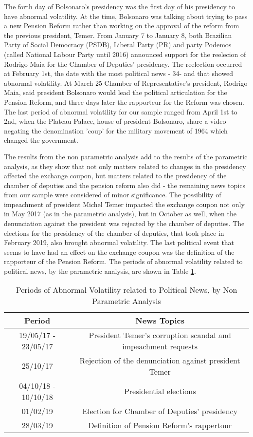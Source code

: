 \documentclass[a4paper]{article}
\begin{document}
The forth day of Bolsonaro's presidency was the first day of his presidency to have abnormal volatility. At the time, Bolsonaro was talking about trying to pass a new Pension Reform rather than working on the approval of the reform from the previous president, Temer. From January 7 to January 8, both Brazilian Party of Social Democracy (PSDB), Liberal Party (PR) and party Podemos (called National Labour Party until 2016) announced support for the reelecion of Rodrigo Maia for the Chamber of Deputies' presidency. The reelection occurred at February 1st, the date with the most political news - 34- and that showed abnormal volatility. At March 25 Chamber of Representative's president, Rodrigo Maia, said president Bolsonaro would lead the political articulation for the Pension Reform, and three days later the rapporteur for the Reform was chosen. The last period of abnormal volatility for our sample ranged from April 1st to 2nd, when the Plateau Palace, house of president Bolsonaro, share a video negating the denomination 'coup' for the military movement of 1964 which changed the government.

The results from the non parametric analysis add to the results of the parametric analysis, as they show that not only matters related to changes in the presidency affected the exchange coupon, but matters related to the presidency of the chamber of deputies and the pension reform also did - the remaining news topics from our sample were considered of minor significance. The possibility of impeachment of president Michel Temer impacted the exchange coupon not only in May 2017 (as in the parametric analysis), but in October as well, when the denunciation against the president was rejected by the chamber of deputies. The elections for the presidency of the chamber of deputies, that took place in February 2019, also brought abnormal volatility. The last political event that seems to have had an effect on the exchange coupon was the definition of the rapporteur of the Pension Reform. The periods of abnormal volatility related to political news, by the parametric analysis, are shown in Table \ref{tab:resnon}.

\begin{table}[H]
\caption{Periods of Abnormal Volatility related to Political News, by Non Parametric Analysis}
\label{tab:resnon}
\centering
\begin{tabular}{| c | c |}
\hline
Period & News Topics \\
\hline \hline
19/05/17 - 23/05/17 & President Temer's corruption scandal and impeachment requests \\
\hline
25/10/17 & Rejection of the denunciation against president Temer \\
\hline
04/10/18 - 10/10/18 & Presidential elections \\
\hline
01/02/19 & Election for Chamber of Deputies' presidency \\
\hline
28/03/19 & Definition of Pension Reform's rappertour \\
\hline
\end{tabular}
\end{table}
\end{document}
